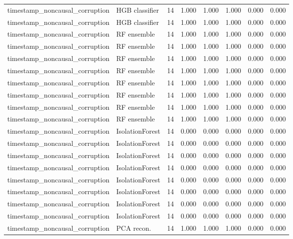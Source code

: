 {\begin{longtable}{llrrrrrr}
timestamp\_noncausal\_corruption & HGB classifier & 14 & 1.000 & 1.000 & 1.000 & 0.000 & 0.000 \\
timestamp\_noncausal\_corruption & HGB classifier & 14 & 1.000 & 1.000 & 1.000 & 0.000 & 0.000 \\
timestamp\_noncausal\_corruption & RF ensemble & 14 & 1.000 & 1.000 & 1.000 & 0.000 & 0.000 \\
timestamp\_noncausal\_corruption & RF ensemble & 14 & 1.000 & 1.000 & 1.000 & 0.000 & 0.000 \\
timestamp\_noncausal\_corruption & RF ensemble & 14 & 1.000 & 1.000 & 1.000 & 0.000 & 0.000 \\
timestamp\_noncausal\_corruption & RF ensemble & 14 & 1.000 & 1.000 & 1.000 & 0.000 & 0.000 \\
timestamp\_noncausal\_corruption & RF ensemble & 14 & 1.000 & 1.000 & 1.000 & 0.000 & 0.000 \\
timestamp\_noncausal\_corruption & RF ensemble & 14 & 1.000 & 1.000 & 1.000 & 0.000 & 0.000 \\
timestamp\_noncausal\_corruption & RF ensemble & 14 & 1.000 & 1.000 & 1.000 & 0.000 & 0.000 \\
timestamp\_noncausal\_corruption & RF ensemble & 14 & 1.000 & 1.000 & 1.000 & 0.000 & 0.000 \\
timestamp\_noncausal\_corruption & IsolationForest & 14 & 0.000 & 0.000 & 0.000 & 0.000 & 0.000 \\
timestamp\_noncausal\_corruption & IsolationForest & 14 & 0.000 & 0.000 & 0.000 & 0.000 & 0.000 \\
timestamp\_noncausal\_corruption & IsolationForest & 14 & 0.000 & 0.000 & 0.000 & 0.000 & 0.000 \\
timestamp\_noncausal\_corruption & IsolationForest & 14 & 0.000 & 0.000 & 0.000 & 0.000 & 0.000 \\
timestamp\_noncausal\_corruption & IsolationForest & 14 & 0.000 & 0.000 & 0.000 & 0.000 & 0.000 \\
timestamp\_noncausal\_corruption & IsolationForest & 14 & 0.000 & 0.000 & 0.000 & 0.000 & 0.000 \\
timestamp\_noncausal\_corruption & IsolationForest & 14 & 0.000 & 0.000 & 0.000 & 0.000 & 0.000 \\
timestamp\_noncausal\_corruption & IsolationForest & 14 & 0.000 & 0.000 & 0.000 & 0.000 & 0.000 \\
timestamp\_noncausal\_corruption & PCA recon. & 14 & 1.000 & 1.000 & 1.000 & 0.000 & 0.000 \\

\end{longtable}}
